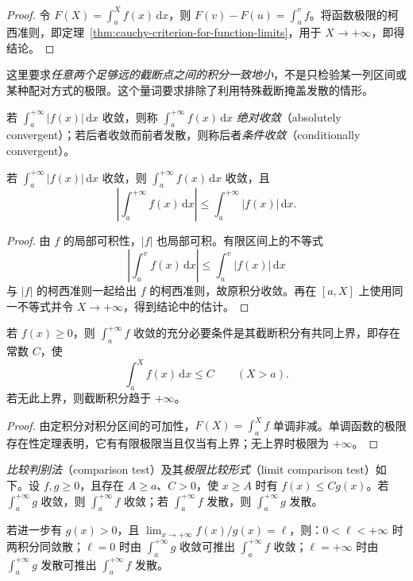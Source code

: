 \documentclass[UTF8,12pt,a4paper,fontset=fandol]{ctexbook}
\begin{document}
\begin{proof}
令 $F(X)=\int_a^X f(x)\,\mathrm{d}x$，则 $F(v)-F(u)=\int_u^v f$。将函数极限的柯西准则，即定理~\ref{thm:cauchy-criterion-for-function-limits}，用于 $X\to+\infty$，即得结论。
\end{proof}

这里要求\emph{任意两个足够远的截断点之间的积分一致地小}，不是只检验某一列区间或某种配对方式的极限。这个量词要求排除了利用特殊截断掩盖发散的情形。

\begin{definition}[绝对收敛与条件收敛]
\label{def:absolute-and-conditional-improper-integrals}
若 $\int_a^{+\infty}|f(x)|\,\mathrm{d}x$ 收敛，则称 $\int_a^{+\infty}f(x)\,\mathrm{d}x$ \emph{绝对收敛}（absolutely convergent）；若后者收敛而前者发散，则称后者\emph{条件收敛}（conditionally convergent）。
\end{definition}

\begin{theorem}[绝对收敛蕴含收敛]
\label{thm:absolute-improper-integrability-implies-convergence}
若 $\int_a^{+\infty}|f(x)|\,\mathrm{d}x$ 收敛，则 $\int_a^{+\infty}f(x)\,\mathrm{d}x$ 收敛，且
\[
    \left|\int_a^{+\infty}f(x)\,\mathrm{d}x\right|
    \leq\int_a^{+\infty}|f(x)|\,\mathrm{d}x.
\]
\end{theorem}

\begin{proof}
由 $f$ 的局部可积性，$|f|$ 也局部可积。有限区间上的不等式
\[
    \left|\int_u^v f(x)\,\mathrm{d}x\right|
    \leq\int_u^v|f(x)|\,\mathrm{d}x
\]
与 $|f|$ 的柯西准则一起给出 $f$ 的柯西准则，故原积分收敛。再在 $[a,X]$ 上使用同一不等式并令 $X\to+\infty$，得到结论中的估计。
\end{proof}

\begin{theorem}[非负函数积分的有界判据]
\label{thm:nonnegative-improper-integral-boundedness}
若 $f(x)\geq0$，则 $\int_a^{+\infty}f$ 收敛的充分必要条件是其截断积分有共同上界，即存在常数 $C$，使
\[
    \int_a^X f(x)\,\mathrm{d}x\leq C\qquad(X>a).
\]
若无此上界，则截断积分趋于 $+\infty$。
\end{theorem}

\begin{proof}
由定积分对积分区间的可加性，$F(X)=\int_a^X f$ 单调非减。单调函数的极限存在性定理表明，它有有限极限当且仅当有上界；无上界时极限为 $+\infty$。
\end{proof}

\begin{theorem}[比较判别法及其极限形式]
\label{thm:comparison-tests-improper-integrals}
\emph{比较判别法}（comparison test）及其\emph{极限比较形式}（limit comparison test）如下。设 $f,g\geq0$，且存在 $A\geq a$、$C>0$，使 $x\geq A$ 时有 $f(x)\leq Cg(x)$。若 $\int_a^{+\infty}g$ 收敛，则 $\int_a^{+\infty}f$ 收敛；若 $\int_a^{+\infty}f$ 发散，则 $\int_a^{+\infty}g$ 发散。

若进一步有 $g(x)>0$，且 $\lim_{x\to+\infty}f(x)/g(x)=\ell$，则：$0<\ell<+\infty$ 时两积分同敛散；$\ell=0$ 时由 $\int_a^{+\infty}g$ 收敛可推出 $\int_a^{+\infty}f$ 收敛；$\ell=+\infty$ 时由 $\int_a^{+\infty}g$ 发散可推出 $\int_a^{+\infty}f$ 发散。
\end{theorem}
\end{document}
